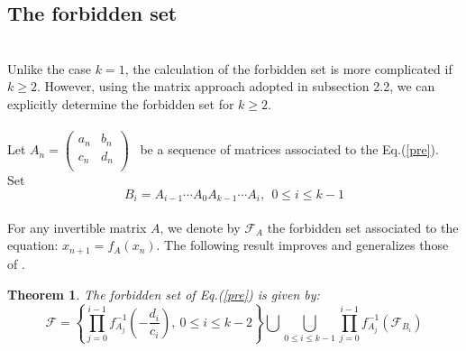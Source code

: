 \documentclass[11pt]{amsart}
\newtheorem{thm}{Theorem}[section]
\theoremstyle{definition}
\theoremstyle{remark}
\theoremstyle{example}
\numberwithin{equation}{section}
\begin{document}
\subsection{\bf The forbidden set} \ \vspace{-3mm}\\

Unlike the case $k = 1$, the calculation of the forbidden set is more complicated if $k\geq2$. However, using the matrix approach adopted in subsection 2.2, we can explicitly determine the forbidden set for $k\geq2$.\\
\vspace{-3mm}
\\
Let
$A_n=\left(\begin{array}{cc}
          a_n & b_n \\
          c_n & d_n \\
        \end{array}\right)$ \ be a sequence of matrices associated to the Eq.(\ref{pre}).\\
Set $$B_i=A_{i-1}\cdots A_0A_{k-1}\cdots A_{i}, \ \ 0\leq i\leq k-1$$
\vspace{-3mm}
\\
For any invertible matrix $A$, we denote by $\mathcal{F}_A$ the forbidden set associated to the equation: $x_{n+1}=f_A(x_n)$.
The following result improves and generalizes those of \cite{1}.\vspace{-3mm}\\
\begin{thm}\rm{
The forbidden set of Eq.(\ref{pre}) is given by:
$$\mathcal{F}=\left\{\prod_{j=0}^{i-1}f_{A_j}^{-1}\left(-\frac{d_i}{c_i}\right), \  0\leq i\leq k-2\right\}\bigcup\bigcup\limits_{0\leq i\leq k-1}\prod_{j=0}^{i-1}f_{A_j}^{-1}\left(\mathcal{F}_{B_i}\right)$$
}\end{thm}\vspace{-3mm}
\medskip
\end{document}
